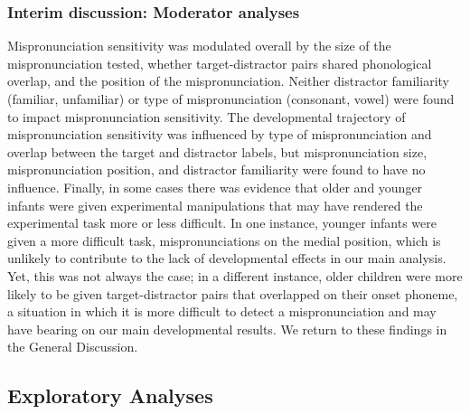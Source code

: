 \documentclass[man, noextraspace]{apa6}
\begin{document}
\hypertarget{interim-discussion-moderator-analyses}{%
\subsubsection{Interim discussion: Moderator analyses}\label{interim-discussion-moderator-analyses}}

Mispronunciation sensitivity was modulated overall by the size of the mispronunciation tested, whether target-distractor pairs shared phonological overlap, and the position of the mispronunciation. Neither distractor familiarity (familiar, unfamiliar) or type of mispronunciation (consonant, vowel) were found to impact mispronunciation sensitivity. The developmental trajectory of mispronunciation sensitivity was influenced by type of mispronunciation and overlap between the target and distractor labels, but mispronunciation size, mispronunciation position, and distractor familiarity were found to have no influence. Finally, in some cases there was evidence that older and younger infants were given experimental manipulations that may have rendered the experimental task more or less difficult. In one instance, younger infants were given a more difficult task, mispronunciations on the medial position, which is unlikely to contribute to the lack of developmental effects in our main analysis. Yet, this was not always the case; in a different instance, older children were more likely to be given target-distractor pairs that overlapped on their onset phoneme, a situation in which it is more difficult to detect a mispronunciation and may have bearing on our main developmental results. We return to these findings in the General Discussion.

\hypertarget{exploratory-analyses}{%
\subsection{Exploratory Analyses}\label{exploratory-analyses}}
\end{document}
